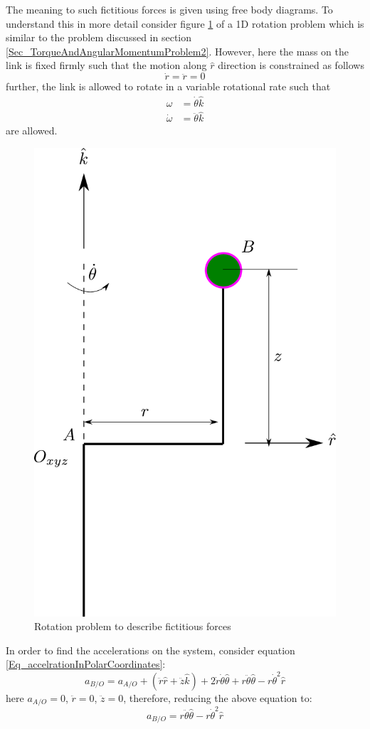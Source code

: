 The meaning to such fictitious forces is given using free body diagrams. To understand this in more detail consider figure \ref{Fig_0_ch_3_fictitiousForces1} of a 1D rotation problem which is similar to the problem discussed in section \ref{Sec_TorqueAndAngularMomentumProblem2}. However, here the mass on the link is fixed firmly such that the motion along $\hat{r}$ direction is constrained as follows
\begin{equation}
	\dot{r} = \ddot{r} = 0
\end{equation}
further, the link is allowed to rotate in a variable rotational rate such that
\begin{align}
	\omega &= \dot{\theta} \hat{k} \\
	\dot{\omega} &= \ddot{\theta} \hat{k}
\end{align}
are allowed.
\newpage
\begin{figure}[h!]
	\centering
	\includegraphics[width=0.5\linewidth]{Bilder/16_FictitiousForces1.pdf}
	\caption{Rotation problem to describe fictitious forces}
	\label{Fig_0_ch_3_fictitiousForces1}
\end{figure}
In order to find the accelerations on the system, consider equation \eqref{Eq_accelrationInPolarCoordinates}:
\begin{equation}
a_{B/O} = a_{A/O} + (\ddot{r}\hat{r} + \ddot{z}\hat{k}) + 2 \dot{r} \dot{\theta} \hat{\theta} +  r \ddot{\theta} \hat{\theta} - r \dot{\theta}^{2} \hat{r}
\end{equation}
here $a_{A/O} = 0$, $\ddot{r} = 0$, $\ddot{z} = 0$, therefore, reducing the above equation to:
\begin{equation}
a_{B/O} = r \ddot{\theta} \hat{\theta} - r \dot{\theta}^{2} \hat{r}
\end{equation}
